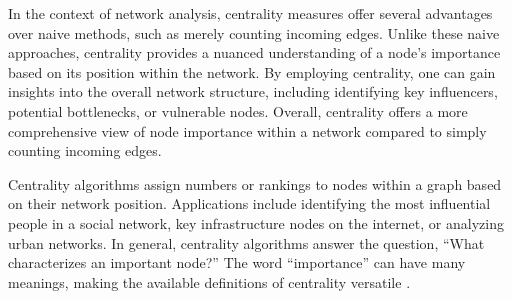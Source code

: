 
In the context of network analysis, centrality measures offer several advantages over naive methods, such as merely counting incoming edges.
Unlike these naive approaches, centrality provides a nuanced understanding of a node's importance based on its position within the network.
By employing centrality, one can gain insights into the overall network structure, including identifying key influencers, potential bottlenecks, or vulnerable nodes.
Overall, centrality offers a more comprehensive view of node importance within a network compared to simply counting incoming edges.


Centrality algorithms assign numbers or rankings to nodes within a graph based on their network position.
Applications include identifying the most influential people in a social network, key infrastructure nodes on the internet, or analyzing urban networks.
In general, centrality algorithms answer the question, “What characterizes an important node?”
The word “importance” can have many meanings, making the available definitions of centrality versatile \cite{Freeman1978}.


